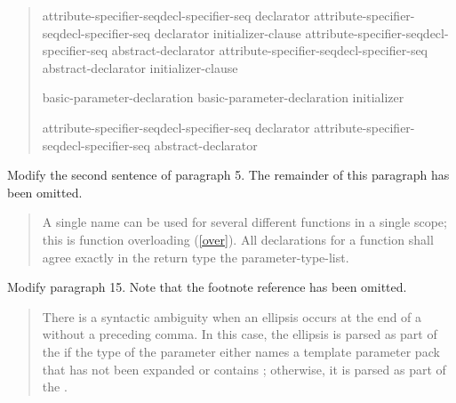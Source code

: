 \begin{quote}
\setcounter{Paras}{2}
\pnum

\begin{bnf}
\begin{removedblock}
\br
    attribute-specifier-seq\opt decl-specifier-seq declarator\br
    attribute-specifier-seq\opt decl-specifier-seq declarator \terminal{=} initializer-clause\br
    attribute-specifier-seq\opt decl-specifier-seq abstract-declarator\opt\br
    attribute-specifier-seq\opt decl-specifier-seq abstract-declarator\opt \terminal{=} initializer-clause
\end{removedblock}

\begin{addedblock}
\br
  basic-parameter-declaration\br
  basic-parameter-declaration \terminal{=} initializer
\end{addedblock}

\begin{addedblock}
\br
    attribute-specifier-seq\opt decl-specifier-seq declarator\br
    attribute-specifier-seq\opt decl-specifier-seq abstract-declarator\opt\br
\end{addedblock}
\end{bnf}
\end{quote}

Modify the second sentence of paragraph 5. The remainder of this
paragraph has been omitted.

\begin{quote}
\setcounter{Paras}{4}
\pnum
A single name can be used for several different functions in a single 
scope; this is function overloading (\ref{over}). 
% 
All declarations for a function shall agree exactly in  
the return type\added{,}  the parameter-type-list.
\end{quote}

Modify paragraph 15. Note that the footnote reference has been
omitted.

\begin{quote}
\setcounter{Paras}{14}
\pnum
There is a syntactic ambiguity when an ellipsis occurs at the end of a 
 without
a preceding comma. In this case, the ellipsis is parsed as part of the 
 if the type of the
parameter either names a template parameter pack that has not been 
expanded or contains   ; otherwise, 
it is parsed as part of the 
.
\end{quote}

